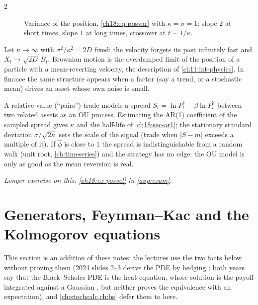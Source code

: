 \begin{paracol}{2}
\begin{figure}[ht]
\caption{Variance of the position, \eqref{ch18:eq-posvar} with $\kappa=\sigma=1$: slope $2$ at short times, slope $1$ at long times, crossover at $t\sim1/\kappa$.}\label{ch18:fig-posvar}
\end{figure}
\begin{intuition}
Let $\kappa\to\infty$ with $\sigma^2/\kappa^2=2D$ fixed: the velocity forgets its past infinitely fast and $X_t\to\sqrt{2D}\,B_t$. Brownian motion is the overdamped limit of the position of a particle with a mean-reverting velocity, the description of \cref{ch11:int-physics}. In finance the same structure appears when a factor (say a trend, or a stochastic mean) drives an asset whose own noise is small.
\end{intuition}
\begin{finance}
A relative-value (``pairs'') trade models a spread $S_t=\ln P^1_t-\beta\ln P^2_t$ between two related assets as an OU process. Estimating the AR(1) coefficient of the sampled spread gives $\kappa$ and the half-life of \cref{ch18:sec-ar1}; the stationary standard deviation $\sigma/\sqrt{2\kappa}$ sets the scale of the signal (trade when $|S-m|$ exceeds a multiple of it). If $\hat\phi$ is close to $1$ the spread is indistinguishable from a random walk (unit root, \cref{ch:timeseries}) and the strategy has no edge: the OU model is only as good as the mean reversion is real.
\end{finance}

\noindent\emph{Longer exercise on this: \cref{ch18:ex-posvel} in \cref{app:exam}.}

\section{Generators, Feynman--Kac and the Kolmogorov equations}\label{ch18:sec-fk}

This section is an addition of these notes: the lectures use the two facts below without proving them (2024 slides 2--3 derive the PDE by hedging ; both years say that the Black--Scholes PDE is the heat equation, whose solution is the payoff integrated against a Gaussian , but neither proves the equivalence with an expectation), and \cref{ch:stochcalc,ch:bs} defer them to here.


\end{paracol}
